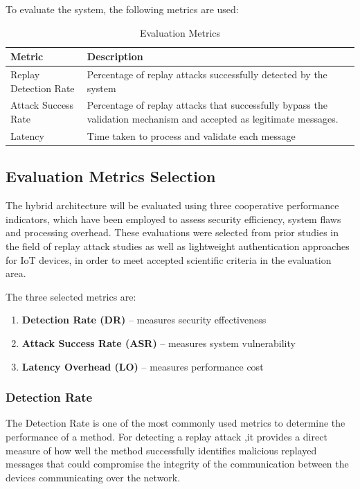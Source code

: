 \documentclass[a4paper,man,12pt]{article}
\begin{document}
To evaluate the system, the following metrics are used: 

\begin{table}[h]
\centering
\begin{tabular}{|l|p{9cm}|}
\hline
\textbf{Metric} & \textbf{Description} \\
\hline
Replay Detection Rate & Percentage of replay attacks successfully detected by the system \\
\hline
Attack Success Rate & Percentage of replay attacks 
that successfully bypass the validation mechanism and accepted 
as legitimate messages. \\
\hline
Latency & Time taken to process and validate each message \\
\hline
\end{tabular}
\caption{Evaluation Metrics}
\label{tab:evaluation_metrics}
\end{table}

\subsection{Evaluation Metrics Selection}

The hybrid architecture will be evaluated using three cooperative performance indicators, which have been employed to assess security efficiency, system flaws and processing overhead. These evaluations were selected from prior studies in the field of replay attack studies as well as lightweight authentication approaches for IoT devices, in order to meet accepted scientific criteria in the evaluation area.


The three selected metrics are:
 
\begin{enumerate}
    \item \textbf{Detection Rate (DR)} -- measures security effectiveness
    \item \textbf{Attack Success Rate (ASR)} -- measures system vulnerability
    \item \textbf{Latency Overhead (LO)} -- measures performance cost
\end{enumerate}
 

\subsubsection{Detection Rate}


The Detection Rate is one of the most commonly used metrics to determine the performance of a method. For detecting a replay attack ,it provides a direct measure of how well the method successfully identifies malicious replayed messages that could compromise the integrity of the communication between the devices communicating over the network.
\end{document}
